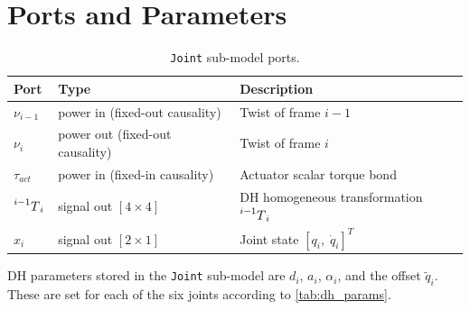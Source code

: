 \begin{center}
\end{center}



\section{Ports and Parameters}

\begin{table}[H]
  \centering
  \caption{\texttt{Joint} sub-model ports.}
  \begin{tabular}{@{}lll@{}}
    \toprule
    Port & Type & Description \\
    \midrule
    \texttt{$\nu_{i-1}$}    & power in  (fixed-out causality) & Twist of frame $i-1$ \\
    \texttt{$\nu_{i}$}  & power out (fixed-out causality) & Twist of frame $i$ \\
    \texttt{$\tau_{act}$}    & power in  (fixed-in causality)  & Actuator scalar torque bond \\
    \texttt{$\prescript{i-1}{}{T}_i$}        & signal out $[4\times4]$         & DH homogeneous transformation $\prescript{i-1}{}{T}_i$ \\
    \texttt{$x_i$}           & signal out $[2\times1]$         & Joint state $[q_i,\;\dot{q}_i]^T$ \\
    \bottomrule
  \end{tabular}
\end{table}

DH parameters stored in the \texttt{Joint} sub-model are $d_i$, $a_i$, $\alpha_i$, and the offset $\tilde{q}_i$.
These are set for each of the six joints according to \ref{tab:dh_params}.

